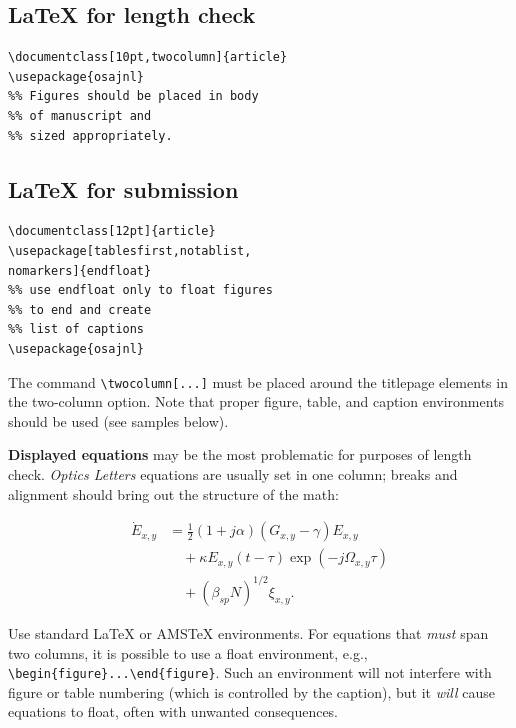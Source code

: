 \documentclass[10pt,letterpaper,twocolumn]{article} %
\begin{document}
\subsection*{LaTeX for length check}
\small
\begin{verbatim}
\documentclass[10pt,twocolumn]{article}
\usepackage{osajnl}
%% Figures should be placed in body 
%% of manuscript and
%% sized appropriately.
\end{verbatim}
\normalsize

\subsection*{LaTeX for submission}
\small
\begin{verbatim}
\documentclass[12pt]{article}
\usepackage[tablesfirst,notablist,
nomarkers]{endfloat} 
%% use endfloat only to float figures 
%% to end and create 
%% list of captions
\usepackage{osajnl}
\end{verbatim}
\normalsize

The command \verb+\twocolumn[...]+ must be placed around the titlepage elements in the two-column option. Note that proper figure, table, and caption environments should be used (see samples below). 

\textbf{Displayed equations} may be the most problematic for purposes of length check. \emph{Optics Letters} equations are usually set in one column; breaks and alignment should bring out the structure of the math:

\begin{align}
{\dot{E}_{x,y}} &=\frac{1}{2}\left( 1+j\alpha \right) \left( G_{x,y}-\gamma \right) E_{x,y}  \label{Eq1} \nonumber \\
&\quad+\kappa E_{x,y}\left( t-\tau \right) \exp \left( -j\Omega
_{x,y}\tau \right) \nonumber \\
&\quad + (\beta _{sp}N)^{1/2} \xi _{x,y}. 
\end{align}


Use standard LaTeX or AMSTeX environments. For equations that \textit{must} span two columns, it is possible to use a float environment, e.g., \verb+\begin{figure}...\end{figure}+. Such an environment will not interfere with figure or table numbering (which is controlled by the caption), but it \textit{will} cause equations to float, often with unwanted consequences.
\end{document}

